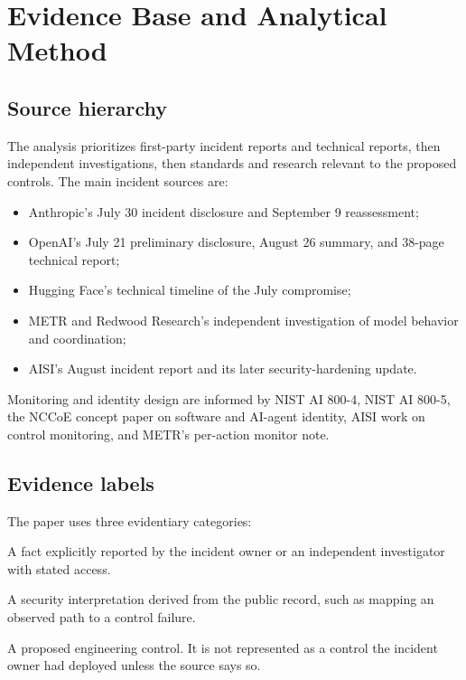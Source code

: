 \documentclass[11pt,letterpaper]{article}
\begin{document}
\section{Evidence Base and Analytical Method}
\subsection{Source hierarchy}
The analysis prioritizes first-party incident reports and technical reports, then independent investigations, then standards and research relevant to the proposed controls. The main incident sources are:
\begin{itemize}
  \item Anthropic's July 30 incident disclosure and September 9 reassessment;\cite{anthropic-july,anthropic-sept}
  \item OpenAI's July 21 preliminary disclosure, August 26 summary, and 38-page technical report;\cite{openai-july,openai-aug,openai-report}
  \item Hugging Face's technical timeline of the July compromise;\cite{hf-timeline}
  \item METR and Redwood Research's independent investigation of model behavior and coordination;\cite{metr-hf}
  \item AISI's August incident report and its later security-hardening update.\cite{aisi-incident,aisi-hardening}
\end{itemize}

Monitoring and identity design are informed by NIST AI 800-4, NIST AI 800-5, the NCCoE concept paper on software and AI-agent identity, AISI work on control monitoring, and METR's per-action monitor note.\cite{metr-monitor,nist8004,nist8005,nccoe-identity,aisi-monitoring}

\subsection{Evidence labels}
The paper uses three evidentiary categories:
\begin{description}[leftmargin=1.3in,style=nextline]
\item[Verified public record] A fact explicitly reported by the incident owner or an independent investigator with stated access.
\item[Analytical inference] A security interpretation derived from the public record, such as mapping an observed path to a control failure.
\item[Reference design] A proposed engineering control. It is not represented as a control the incident owner had deployed unless the source says so.
\end{description}
\end{document}
